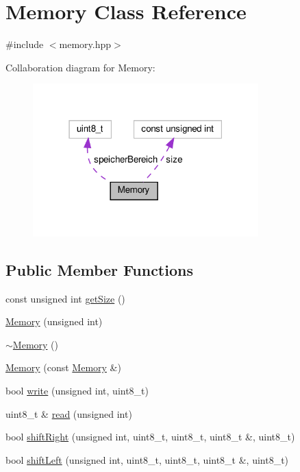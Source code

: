 \hypertarget{class_memory}{}\section{Memory Class Reference}
\label{class_memory}


{\ttfamily \#include $<$memory.\+hpp$>$}



Collaboration diagram for Memory\+:
\nopagebreak
\begin{figure}[H]
\begin{center}
\leavevmode
\includegraphics[width=247pt]{class_memory__coll__graph}
\end{center}
\end{figure}
\subsection*{Public Member Functions}
\begin{DoxyCompactItemize}
\item 
const unsigned int \mbox{\hyperlink{class_memory_a9687fde54e7c10c54060117045060613}{get\+Size}} ()
\item 
\mbox{\hyperlink{class_memory_ae9f83eab19db80cb53bf79a5096d05a9}{Memory}} (unsigned int)
\item 
\mbox{\hyperlink{class_memory_a0ffa9759ebbf103f11132a505b93bdc0}{$\sim$\+Memory}} ()
\item 
\mbox{\hyperlink{class_memory_a074fa74eaf054e7e420c35c573b46e21}{Memory}} (const \mbox{\hyperlink{class_memory}{Memory}} \&)
\item 
bool \mbox{\hyperlink{class_memory_a0e00ea7d13e602be37af361426aa3a50}{write}} (unsigned int, uint8\+\_\+t)
\item 
uint8\+\_\+t \& \mbox{\hyperlink{class_memory_ab669beeca09308c880af9b13cde7f655}{read}} (unsigned int)
\item 
bool \mbox{\hyperlink{class_memory_af57be7a362ba6670fc983ac5cceb34a5}{shift\+Right}} (unsigned int, uint8\+\_\+t, uint8\+\_\+t, uint8\+\_\+t \&, uint8\+\_\+t)
\item 
bool \mbox{\hyperlink{class_memory_a274d126eea46f966a36a2eb69da949ab}{shift\+Left}} (unsigned int, uint8\+\_\+t, uint8\+\_\+t, uint8\+\_\+t \&, uint8\+\_\+t)
\end{DoxyCompactItemize}

